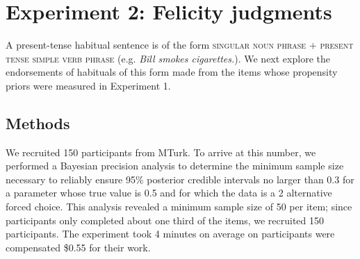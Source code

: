 \documentclass[10pt,letterpaper]{article}
\newcommand{\ndg}[1]{\textcolor{Green}{[ndg: #1]}}
\newcommand{\mht}[1]{\textcolor{DarkOrange}{[mht: #1]}}
\begin{document}



\section{Experiment 2: Felicity judgments}
A present-tense habitual sentence is of the form \textsc{singular noun phrase} $+$ \textsc{present tense simple verb phrase} (e.g. \emph{Bill smokes cigarettes.}).  
We next explore the endorsements of habituals of this form made from the items whose propensity priors were measured in Experiment 1. 

\subsection{Methods}

We recruited 150 participants from MTurk.%
To arrive at this number, we performed a Bayesian precision analysis to determine the minimum sample size necessary to reliably ensure 95\% posterior credible intervals no larger than 0.3 for a parameter whose true value is 0.5 and for which the data is a 2 alternative forced choice. This analysis revealed a minimum sample size of 50 per item; since participants only completed about one third of the items, we recruited 150 participants.
The experiment took 4 minutes on average on participants were compensated \$0.55 for their work.
\end{document}
